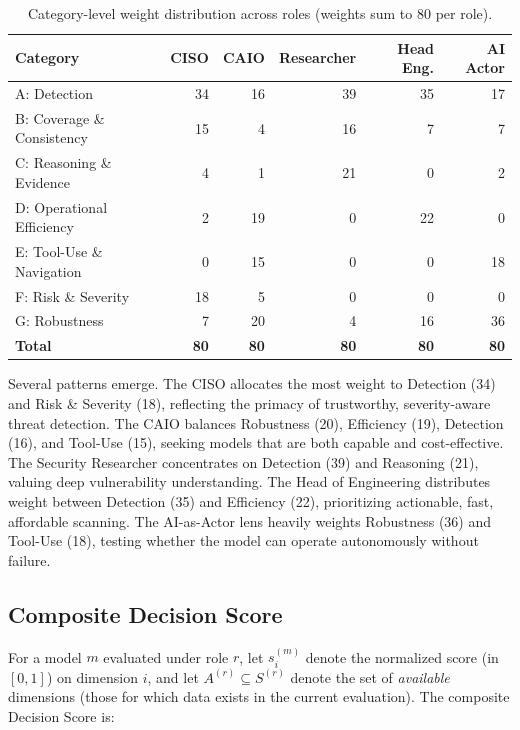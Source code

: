 \documentclass[10pt,twocolumn]{article}
\begin{document}
\begin{table}[t]
\centering
\caption{Category-level weight distribution across roles (weights sum to 80 per role).}
\label{tab:category_weights}
\small
\begin{tabular}{@{}l r r r r r@{}}
\toprule
\textbf{Category} & \textbf{CISO} & \textbf{CAIO} & \textbf{Researcher} & \textbf{Head Eng.} & \textbf{AI Actor} \\
\midrule
A: Detection                 & 34 & 16 & 39 & 35 & 17 \\
B: Coverage \& Consistency   & 15 &  4 & 16 &  7 &  7 \\
C: Reasoning \& Evidence     &  4 &  1 & 21 &  0 &  2 \\
D: Operational Efficiency    &  2 & 19 &  0 & 22 &  0 \\
E: Tool-Use \& Navigation    &  0 & 15 &  0 &  0 & 18 \\
F: Risk \& Severity          & 18 &  5 &  0 &  0 &  0 \\
G: Robustness                &  7 & 20 &  4 & 16 & 36 \\
\midrule
\textbf{Total}               & \textbf{80} & \textbf{80} & \textbf{80} & \textbf{80} & \textbf{80} \\
\bottomrule
\end{tabular}
\end{table}

Several patterns emerge. The CISO allocates the most weight to Detection (34) and Risk \& Severity (18), reflecting the primacy of trustworthy, severity-aware threat detection. The CAIO balances Robustness (20), Efficiency (19), Detection (16), and Tool-Use (15), seeking models that are both capable and cost-effective. The Security Researcher concentrates on Detection (39) and Reasoning (21), valuing deep vulnerability understanding. The Head of Engineering distributes weight between Detection (35) and Efficiency (22), prioritizing actionable, fast, affordable scanning. The AI-as-Actor lens heavily weights Robustness (36) and Tool-Use (18), testing whether the model can operate autonomously without failure.

\subsection{Composite Decision Score}
\label{sec:composite}

For a model $m$ evaluated under role $r$, let $s_i^{(m)}$ denote the normalized score (in $[0, 1]$) on dimension $i$, and let $A^{(r)} \subseteq S^{(r)}$ denote the set of \emph{available} dimensions (those for which data exists in the current evaluation). The composite Decision Score is:
\end{document}
